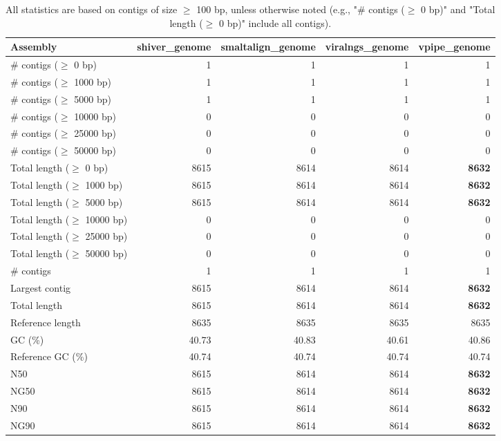 \documentclass[12pt,a4paper]{article}
\begin{document}
\begin{table}[ht]
\begin{center}
\caption{All statistics are based on contigs of size $\geq$ 100 bp, unless otherwise noted (e.g., "\# contigs ($\geq$ 0 bp)" and "Total length ($\geq$ 0 bp)" include all contigs).}
\begin{tabular}{|l*{4}{|r}|}
\hline
Assembly & shiver\_genome & smaltalign\_genome & viralngs\_genome & vpipe\_genome \\ \hline
\# contigs ($\geq$ 0 bp) & 1 & 1 & 1 & 1 \\ \hline
\# contigs ($\geq$ 1000 bp) & 1 & 1 & 1 & 1 \\ \hline
\# contigs ($\geq$ 5000 bp) & 1 & 1 & 1 & 1 \\ \hline
\# contigs ($\geq$ 10000 bp) & 0 & 0 & 0 & 0 \\ \hline
\# contigs ($\geq$ 25000 bp) & 0 & 0 & 0 & 0 \\ \hline
\# contigs ($\geq$ 50000 bp) & 0 & 0 & 0 & 0 \\ \hline
Total length ($\geq$ 0 bp) & 8615 & 8614 & 8614 & {\bf 8632} \\ \hline
Total length ($\geq$ 1000 bp) & 8615 & 8614 & 8614 & {\bf 8632} \\ \hline
Total length ($\geq$ 5000 bp) & 8615 & 8614 & 8614 & {\bf 8632} \\ \hline
Total length ($\geq$ 10000 bp) & 0 & 0 & 0 & 0 \\ \hline
Total length ($\geq$ 25000 bp) & 0 & 0 & 0 & 0 \\ \hline
Total length ($\geq$ 50000 bp) & 0 & 0 & 0 & 0 \\ \hline
\# contigs & 1 & 1 & 1 & 1 \\ \hline
Largest contig & 8615 & 8614 & 8614 & {\bf 8632} \\ \hline
Total length & 8615 & 8614 & 8614 & {\bf 8632} \\ \hline
Reference length & 8635 & 8635 & 8635 & 8635 \\ \hline
GC (\%) & 40.73 & 40.83 & 40.61 & 40.86 \\ \hline
Reference GC (\%) & 40.74 & 40.74 & 40.74 & 40.74 \\ \hline
N50 & 8615 & 8614 & 8614 & {\bf 8632} \\ \hline
NG50 & 8615 & 8614 & 8614 & {\bf 8632} \\ \hline
N90 & 8615 & 8614 & 8614 & {\bf 8632} \\ \hline
NG90 & 8615 & 8614 & 8614 & {\bf 8632} \\ \hline

\end{tabular}
\end{center}
\end{table}
\end{document}
